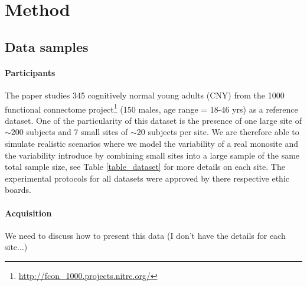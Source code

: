 \documentclass[authoryear]{elsarticle}
\begin{document}
\section{Method}

\subsection{Data samples} 

\paragraph{Participants}
The paper studies 345 cognitively normal young adults (CNY) from the 1000 functional connectome project\footnote{\url{http://fcon_1000.projects.nitrc.org/}} (150 males, age range = 18-46 yrs) as a reference dataset. One of the particularity of this dataset is the presence of one large site of $\sim200$ subjects and 7 small sites of $\sim20$ subjects per site. We are therefore able to simulate realistic scenarios where we model the variability of a real monosite and the variability introduce by combining small sites into a large sample of the same total sample size, see Table \ref{table_dataset} for more details on each site. The experimental protocols for all datasets were approved by there respective ethic boards.

\paragraph{Acquisition} %

We need to discuss how to present this data (I don't have the details for each site...)
\end{document}
